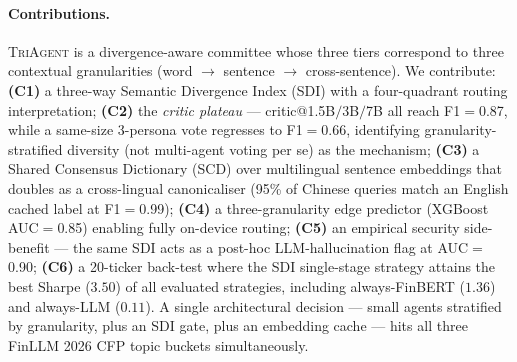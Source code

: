 \paragraph{Contributions.}
\textsc{TriAgent} is a divergence-aware committee whose three tiers
correspond to three contextual granularities (word $\to$ sentence
$\to$ cross-sentence). We contribute:
\textbf{(C1)} a three-way Semantic Divergence Index (SDI) with a
four-quadrant routing interpretation;
\textbf{(C2)} the \emph{critic plateau} --- critic@1.5B$/$3B$/$7B
all reach F1$=$0.87, while a same-size 3-persona vote regresses to
F1$=$0.66, identifying granularity-stratified diversity (not
multi-agent voting per se) as the mechanism;
\textbf{(C3)} a Shared Consensus Dictionary (SCD) over multilingual
sentence embeddings that doubles as a cross-lingual canonicaliser
(95\% of Chinese queries match an English cached label at
F1$=$0.99);
\textbf{(C4)} a three-granularity edge predictor (XGBoost AUC$=$0.85)
enabling fully on-device routing;
\textbf{(C5)} an empirical security side-benefit --- the same SDI
acts as a post-hoc LLM-hallucination flag at AUC$=$0.90;
\textbf{(C6)} a 20-ticker back-test where the SDI single-stage
strategy attains the best Sharpe ($3.50$) of all evaluated
strategies, including always-FinBERT ($1.36$) and always-LLM
($0.11$).
A single architectural decision --- small agents stratified by
granularity, plus an SDI gate, plus an embedding cache --- hits all
three FinLLM 2026 CFP topic buckets simultaneously.
